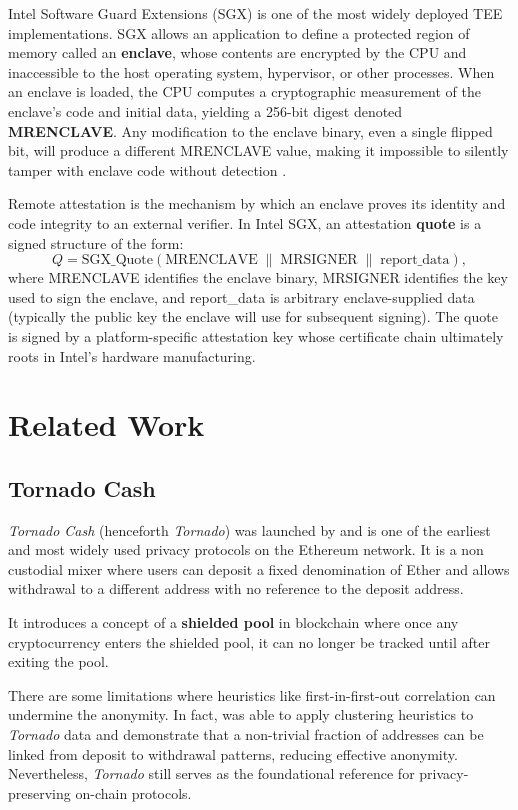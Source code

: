 \documentclass[12pt,a4paper]{article}
\begin{document}
Intel Software Guard Extensions (SGX) is one of the most widely deployed TEE implementations. SGX allows an application to define a protected region of memory called an \textbf{enclave}, whose contents are encrypted by the CPU and inaccessible to the host operating system, hypervisor, or other processes. When an enclave is loaded, the CPU computes a cryptographic measurement of the enclave's code and initial data, yielding a 256-bit digest denoted \textbf{MRENCLAVE}. Any modification to the enclave binary, even a single flipped bit, will produce a different MRENCLAVE value, making it impossible to silently tamper with enclave code without detection \parencite{costan2016intel}.

Remote attestation is the mechanism by which an enclave proves its identity and code integrity to an external verifier. In Intel SGX, an attestation \textbf{quote} is a signed structure of the form:
$$
Q = \text{SGX\_Quote}\!\left(\text{MRENCLAVE} \;\|\; \text{MRSIGNER} \;\|\; \text{report\_data}\right),
$$
where MRENCLAVE identifies the enclave binary, MRSIGNER identifies the key used to sign the enclave, and report\_data is arbitrary enclave-supplied data (typically the public key the enclave will use for subsequent signing). The quote is signed by a platform-specific attestation key whose certificate chain ultimately roots in Intel's hardware manufacturing.

\section{Related Work}
\subsection{Tornado Cash}
\textit{Tornado Cash} (henceforth \textit{Tornado}) was launched by \textcite{pertsev2019tornado} and is one of the earliest and most widely used privacy protocols on the Ethereum network. It is a non custodial mixer where users can deposit a fixed denomination of Ether and allows withdrawal to a different address with no reference to the deposit address. 

It introduces a concept of a \textbf{shielded pool} in blockchain where once any cryptocurrency enters the shielded pool, it can no longer be tracked until after exiting the pool.

There are some limitations where heuristics like first-in-first-out correlation can undermine the anonymity. In fact, \textcite{tang2021analysis} was able to apply clustering heuristics to \textit{Tornado} data and demonstrate that a non-trivial fraction of addresses can be linked from deposit to withdrawal patterns, reducing effective anonymity. Nevertheless, \textit{Tornado} still serves as the foundational reference for privacy-preserving on-chain protocols. 
\end{document}

